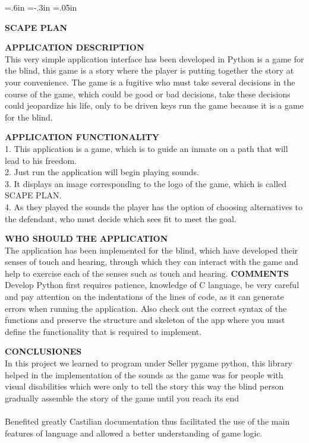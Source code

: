 {\leftskip=.6in  \parindent=-.3in  \parskip=.05in

\bigskip

\centerline {\namefont \LARGE \bf SCAPE PLAN}
\bigskip
\bigskip
\bigskip

{\bf APPLICATION DESCRIPTION}
\bigskip
\\This very simple application interface has been developed in Python is a game for the blind, this game is a story where the player is putting together the story at your convenience. The game is a fugitive who must take several decisions in the course of the game, which could be good or bad decisions, take these decisions could jeopardize his life, only to be driven keys run the game because it is a game for the blind.
\bigskip
\bigskip

{\bf APPLICATION FUNCTIONALITY}
\bigskip
\\1. This application is a game, which is to guide an inmate on a path that will lead to his freedom.\\

2. Just run the application will begin playing sounds.\\

3. It displays an image corresponding to the logo of the game, which is called SCAPE PLAN.\\

4. As they played the sounds the player has the option of choosing alternatives to the defendant, who must decide which sees fit to meet the goal.\\

\bigskip
\bigskip

{\bf WHO SHOULD THE APPLICATION}
\bigskip
\\The application has been implemented for the blind, which have developed their senses of touch and hearing, through which they can interact with the game and help to exercise each of the senses such as touch and hearing.
\bigskip
\bigskip
\newpage
{\bf COMMENTS}
\bigskip
\\Develop Python first requires patience, knowledge of C language, be very careful and pay attention on the indentations of the lines of code, as it can generate errors when running the application. Also check out the correct syntax of the functions and preserve the structure and skeleton of the app where you must define the functionality that is required to implement. 
\bigskip
\bigskip


{\bf CONCLUSIONES}
\bigskip
\\In this project we learned to program under Seller pygame python, this library helped in the implementation of the sounds as the game was for people with visual disabilities which were only to tell the story this way the blind person gradually assemble the story of the game until you reach its end\\
\\Benefited greatly Castilian documentation thus facilitated the use of the main features of language and allowed a better understanding of game logic.\\
\bigskip
\bigskip

}
